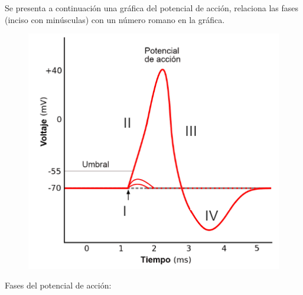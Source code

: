 \documentclass[12pt, letter]{exam}
\begin{document}
\begin{questions}
    \newpage

    \question Se presenta a continuación una gráfica del potencial de acción, relaciona las fases (inciso con minúsculas) con un número romano en la gráfica.
    \begin{figure}[H]
        \centering
        \includegraphics[scale=0.75]{Potencial_Accion_07.png}
    \end{figure}

    Fases del potencial de acción:
    \renewcommand{\thepartno}{\alph{partno}}
    \begin{multicols}{2}
    \end{multicols}


\end{questions}
\end{document}
